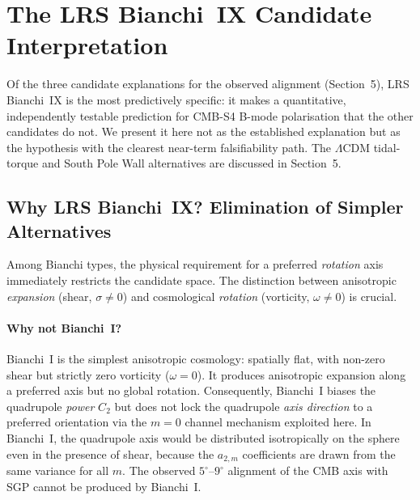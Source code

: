 \documentclass[12pt]{article}
\begin{document}
\section{The LRS Bianchi~IX Candidate Interpretation}

Of the three candidate explanations for the observed alignment (Section~5),
LRS Bianchi~IX is the most predictively specific: it makes a quantitative,
independently testable prediction for CMB-S4 B-mode polarisation that the
other candidates do not.
We present it here not as the established explanation but as the hypothesis
with the clearest near-term falsifiability path.
The $\Lambda$CDM tidal-torque and South Pole Wall alternatives are discussed
in Section~5.

\subsection{Why LRS Bianchi~IX? Elimination of Simpler Alternatives}

Among Bianchi types, the physical requirement for a preferred \emph{rotation} axis
immediately restricts the candidate space. The distinction between anisotropic
\emph{expansion} (shear, $\sigma\neq0$) and cosmological \emph{rotation} (vorticity,
$\omega\neq0$) is crucial.

\paragraph{Why not Bianchi~I?}
Bianchi~I is the simplest anisotropic cosmology: spatially flat, with non-zero shear
but strictly zero vorticity ($\omega=0$). It produces anisotropic expansion along a
preferred axis but no global rotation. Consequently, Bianchi~I biases the quadrupole
\emph{power} $C_2$ but does not lock the quadrupole \emph{axis direction} to a
preferred orientation via the $m=0$ channel mechanism exploited here. In Bianchi~I,
the quadrupole axis would be distributed isotropically on the sphere even in the
presence of shear, because the $a_{2,m}$ coefficients are drawn from the same
variance for all $m$. The observed $5^\circ$--$9^\circ$ alignment of the CMB axis
with SGP cannot be produced by Bianchi~I.
\end{document}
